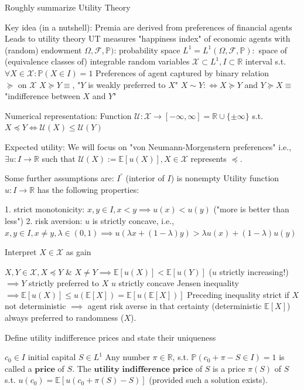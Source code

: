 \documentclass[11pt,a4paper,twoside]{article}
\begin{document}
Roughly summarize Utility Theory


Key idea (in a nutshell): Premia are derived from preferences of financial agents
Leads to utility theory
UT measures "happiness index" of economic agents with (random) endowment
\(\Omega, \mathcal{F}, \mathbb{P})\): probability space
\(L^1 = L^1(\Omega, \mathcal{F}, \mathbb{P}):\) space of (equivalence classes of) integrable random variables
\(\mathcal{X} \subset L^1, I \subset \mathbb{R}\) interval s.t.
\(\forall X \in \mathcal{X}: \mathbb{P}(X \in I) = 1\)
Preferences of agent captured by binary relation \(\succeq \text{ on } \mathcal{X}\)
\(X \succeq Y \equiv\), "\(Y\) is weakly preferred to \( X \)"
\(X \sim Y : \iff X \succeq Y\) and \(Y \succeq X \equiv\) "indifference between \(X\) and \(Y\)"

Numerical representation: Function 
\(\mathcal{U}: \mathcal{X} \rightarrow [-\infty, \infty] = \mathbb{R} \cup \{\pm \infty\}\) s.t. 
\(X \preceq Y \iff \mathcal{U}(X) \le \mathcal{U}(Y)\)

Expected utility: We will focus on "von Neumann-Morgenstern preferences"
i.e., \(\exists u: I \rightarrow \mathbb{R}\) such that \(\mathcal{U}(X) := \mathbb{E}[u(X)], X \in \mathcal{X}\) 
represents \(\preceq\).

Some further assumptions are:
\( I^{°} \) (interior of \(I\)) is nonempty
Utility function \(u: I \rightarrow \mathbb{R}\) has the following properties:

1. strict monotonicity: \(x, y \in I, x < y \implies u(x) < u(y)\) ("more is better than less")
2. risk aversion: \(u\) is strictly concave, i.e., 
    \(x, y \in I, x \ne y, \lambda \in (0, 1) \implies u(\lambda x + (1 - \lambda) y) > \lambda u(x) + (1 - \lambda) u(y)\)

Interpret \(X \in \mathcal{X}\) as gain

\(X, Y \in \mathcal{X}, X \preceq Y\) & \(X \ne Y \implies \mathbb{E}[u(X)] < \mathbb{E}[u(Y)]\) (\(u\) strictly increasing!)
\(\implies Y\) strictly preferred to \(X\)
\(u\) strictly concave
Jensen inequality \(\implies \mathbb{E}[u(X)] \le u(\mathbb{E}[X]) = \mathbb{E}[u(\mathbb{E}[X])]\)
Preceding inequality strict if \(X\) not deterministic
\(\implies\) agent risk averse in that certainty (deterministic \(\mathbb{E}[X]\)) always preferred to randomness (\(X\)).


Define utility indifference prices and state their uniqueness

\( c_0 \in I \) initial capital
\( S \in L^1 \)
Any number \( \pi \in \mathbb{R} \), s.t. \(\mathbb{P}(c_0 + \pi - S \in I) = 1\) is called a \(\textbf{price}\) of \( S \).
The \(\textbf{utility indifference price}\) of  \(S\) is a price \(\pi(S)\) of \(S\) s.t.
\(u(c_0) = \mathbb{E}[u(c_0 + \pi(S) - S)]\)
(provided such a solution exists).
\end{document}
